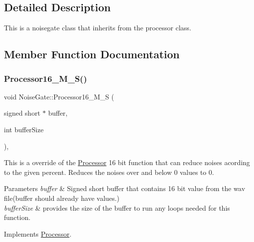 \subsection{Detailed Description}
This is a noisegate class that inherits from the processor class. 

\subsection{Member Function Documentation}
\mbox{\label{classNoiseGate_a8e1f9ab7c18b029fdae17ec621ac91d0}} 
\subsubsection{\texorpdfstring{Processor16\+\_\+\+M\+\_\+\+S()}{Processor16\_M\_S()}}
{\footnotesize\ttfamily void Noise\+Gate\+::\+Processor16\+\_\+\+M\+\_\+S (\begin{DoxyParamCaption}\item[{signed short $\ast$}]{buffer,  }\item[{int}]{buffer\+Size }\end{DoxyParamCaption})\hspace{0.3cm}{\ttfamily [override]}, {\ttfamily [virtual]}}



This is a override of the \hyperlink{classProcessor}{Processor} 16 bit function that can reduce noises acording to the given percent. Reduces the noises over and below 0 values to 0. 


\begin{DoxyParams}{Parameters}
{\em buffer} & Signed short buffer that contains 16 bit value from the wav file(buffer should already have values.) \\
\hline
{\em buffer\+Size} & provides the size of the buffer to run any loops needed for this function. \\
\hline
\end{DoxyParams}


Implements \hyperlink{classProcessor_a2a0903d1ca9e627e8a45e5159ecc0505}{Processor}.

\mbox{\label{classNoiseGate_afbf50fc4dce474a9f588696756b7e1ad}} 

